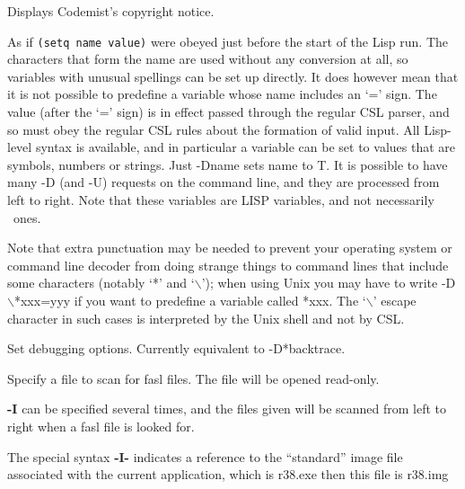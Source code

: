 \hspace*{.25in}\parbox{4.5in}{Displays Codemist's copyright notice.
}

\vspace{2mm}
\vspace{1mm}

\hspace*{.25in}\parbox{4.5in}{
As if {\tt (setq name value)} were obeyed just before the start of the
Lisp run.  The characters that form the name are used without any
conversion at all, so variables with unusual spellings can be set up
directly.  It does however mean that it is not possible to predefine a
variable whose name includes an `=' sign.  The value (after the `='
sign) is in effect passed through the regular CSL parser, and so must
obey the regular CSL rules about the formation of valid input.  All
Lisp-level syntax is available, and in particular a variable can be
set to values that are symbols, numbers or strings.  Just -Dname sets
name to T.  It is possible to have many -D (and -U) requests on the
command line, and they are processed from left to right.  Note that
these variables are LISP variables, and not necessarily \REDUCE\  ones.}

\hspace*{.25in}\parbox{4.5in}{Note that extra punctuation may be
needed to prevent your operating system or command line decoder from
doing strange things to command lines that include some characters
(notably `*' and `$\backslash$'); when using Unix you may have to
write -D$\backslash$*xxx=yyy if you want to predefine a variable
called *xxx. The `$\backslash$' escape character in such cases is
interpreted by the Unix shell and not by CSL.
}

\vspace{2mm} 
\vspace{1mm}

\hspace*{.25in}\parbox{4.5in}{Set debugging options.  Currently equivalent to
-D*backtrace.}

\vspace{2mm}
\vspace{1mm}

\hspace*{.25in}\parbox{4.5in}{Specify a file to scan for fasl files.
The file will be opened read-only.

{\bf -I} can be specified several times, and the files given will
be scanned from left to right when a fasl file is looked for.

The special syntax {\bf -I-} indicates a reference to the ``standard''
image file associated with the current application, which is
r38.exe then this file is r38.img
}

